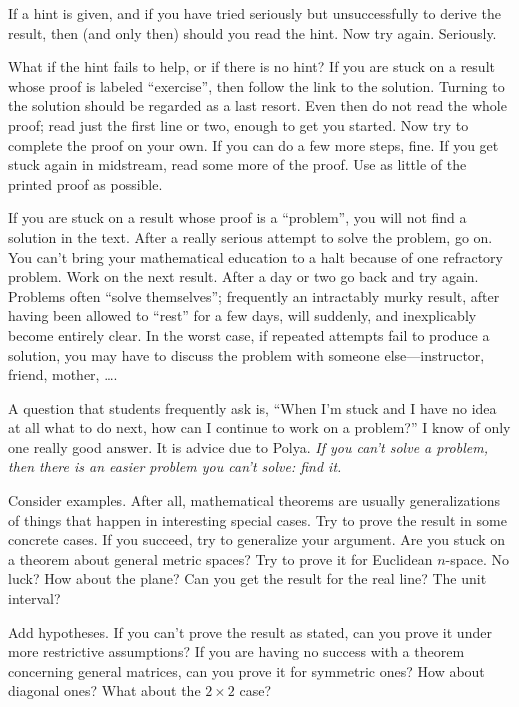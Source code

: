 If a hint is given, and if you have tried seriously but unsuccessfully to derive the result,
then (and only then) should you read the hint. Now try again. Seriously.

What if the hint fails to help, or if there is no hint?  If you are stuck on a result whose
proof is labeled ``exercise'', then follow the link to the solution.  Turning to the solution
should be regarded as a last resort.  Even then do not read the whole proof; read just the
first line or two, enough to get you started.  Now try to complete the proof on your own. If
you can do a few more steps, fine. If you get stuck again in midstream, read some more of the
proof. Use as little of the printed proof as possible.

If you are stuck on a result whose proof is a ``problem'', you will not find a solution in the
text.  After a really serious attempt to solve the problem, go on.  You can't bring your
mathematical education to a halt because of one refractory problem. Work on the next result.
After a day or two go back and try again. Problems often ``solve themselves''; frequently an
intractably murky result, after having been allowed to ``rest'' for a few days, will suddenly,
and inexplicably become entirely clear.  In the worst case, if repeated attempts fail to
produce a solution, you may have to discuss the problem with someone else---instructor,
friend, mother, \dots .

A question that students frequently ask is, ``When I'm stuck and I have no idea at all
what to do next, how can I continue to work on a problem?''  I know of only one really
good answer. It is advice due to Polya. \emph{If you can't solve a problem, then there is
an easier problem you can't solve: find it.}

Consider examples.  After all, mathematical theorems are usually generalizations of things
that happen in interesting special cases. Try to prove the result in some concrete cases.  If
you succeed, try to generalize your argument.  Are you stuck on a theorem about general metric
spaces?  Try to prove it for Euclidean $n$-space. No luck?  How about the plane?  Can you get
the result for the real line?  The unit interval?

Add hypotheses. If you can't prove the result as stated, can you prove it under more
restrictive assumptions?  If you are having no success with a theorem concerning general
matrices, can you prove it for symmetric ones?  How about diagonal ones?  What about the $2
\times 2$ case?

